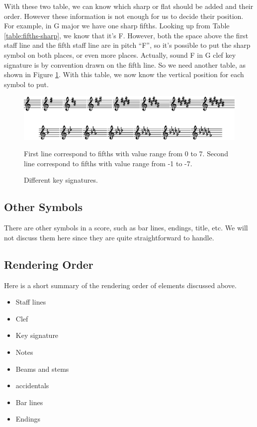 With these two table, we can know which sharp or flat should be added and their order. However these information is not enough for us to decide their position. For example, in G major we have one sharp fifths. Looking up from Table \ref{table:fifths-sharp}, we know that it's F. However, both the space above the first staff line and the fifth staff line are in pitch ``F'', so it's possible to put the sharp symbol on both places, or even more places. Actually, sound F in G clef key signature is by convention drawn on the fifth line. So we need another table, as shown in Figure \ref{fig:key-signatures}. With this table, we now know the vertical position for each symbol to put.

\begin{figure}[t]
    \centering
    \includegraphics[scale=0.72]{Figures/key-signatures.eps}
    \caption{Different key signatures.}
    \label{fig:key-signatures}
    \startdescription

    First line correspond to fifths with value range from 0 to 7. 
    Second line correspond to fifths with value range from -1 to -7.
\end{figure}

\subsection{Other Symbols}
There are other symbols in a score, such as bar lines, endings, title, etc. We will not discuss them here since they are quite straightforward to handle.

\subsection{Rendering Order}
Here is a short summary of the rendering order of elements discussed above.
\begin{itemize}
    \item Staff lines
    \item Clef
    \item Key signature
    \item Notes
    \item Beams and stems
    \item accidentals
    \item Bar lines
    \item Endings
\end{itemize}


